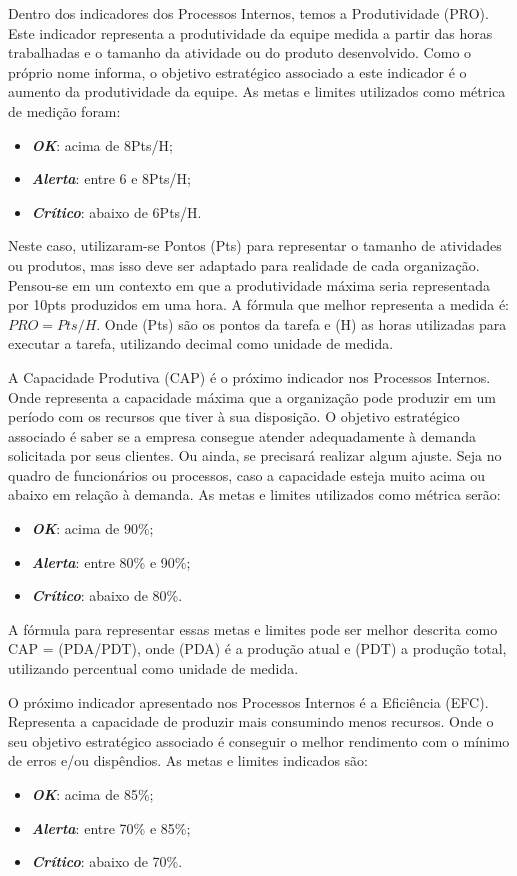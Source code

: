 \documentclass[
	12pt,				%
	openright,			%
	oneside,			%
	a4paper,			%
	english,			%
	brazil				%
	]{abntex2}
\begin{document}
Dentro dos indicadores dos Processos Internos, temos a Produtividade (PRO). Este indicador representa a produtividade da equipe medida a partir das horas trabalhadas e o tamanho da atividade ou do produto desenvolvido. Como o próprio nome informa, o objetivo estratégico associado a este indicador é o aumento da produtividade da equipe. As metas e limites utilizados como métrica de medição foram:

\begin{itemize}
\item  \textbf{\textit{OK}}: acima de 8Pts/H;
\item  \textbf{\textit{Alerta}}: entre 6 e 8Pts/H;
\item  \textbf{\textit{Crítico}}: abaixo de 6Pts/H.
\end{itemize}

Neste caso, utilizaram-se Pontos (Pts) para representar o tamanho de atividades ou produtos, mas isso deve ser adaptado para realidade de cada organização. Pensou-se em um contexto em que a produtividade máxima seria representada por 10pts produzidos em uma hora. A fórmula que melhor representa a medida é: $PRO = Pts/H$. Onde (Pts) são os pontos da tarefa e (H) as horas utilizadas para executar a tarefa, utilizando decimal como unidade de medida.

A Capacidade Produtiva (CAP) é o próximo indicador nos Processos Internos. Onde representa a capacidade máxima que a organização pode produzir em um período com os recursos que tiver à sua disposição. O objetivo estratégico associado é saber se a empresa consegue atender adequadamente à demanda solicitada por seus clientes. Ou ainda, se precisará realizar algum ajuste. Seja no quadro de funcionários ou processos, caso a capacidade esteja muito acima ou abaixo em relação à demanda. As metas e limites utilizados como métrica serão:
\begin{itemize}
\item  \textbf{\textit{OK}}: acima de 90\%;
\item  \textbf{\textit{Alerta}}: entre 80\% e 90\%;
\item  \textbf{\textit{Crítico}}: abaixo de 80\%.
\end{itemize}

A fórmula para representar essas metas e limites pode ser melhor descrita como CAP = (PDA/PDT), onde (PDA) é a produção atual e (PDT) a produção total, utilizando percentual como unidade de medida.

O próximo indicador apresentado nos Processos Internos é a Eficiência (EFC). Representa a capacidade de produzir mais consumindo menos recursos. Onde o seu objetivo estratégico associado é conseguir o melhor rendimento com o mínimo de erros e/ou dispêndios. As metas e limites indicados são:
\begin{itemize}
\item  \textbf{\textit{OK}}: acima de 85\%;
\item  \textbf{\textit{Alerta}}: entre 70\% e 85\%;
\item  \textbf{\textit{Crítico}}: abaixo de 70\%.
\end{itemize}
\end{document}
